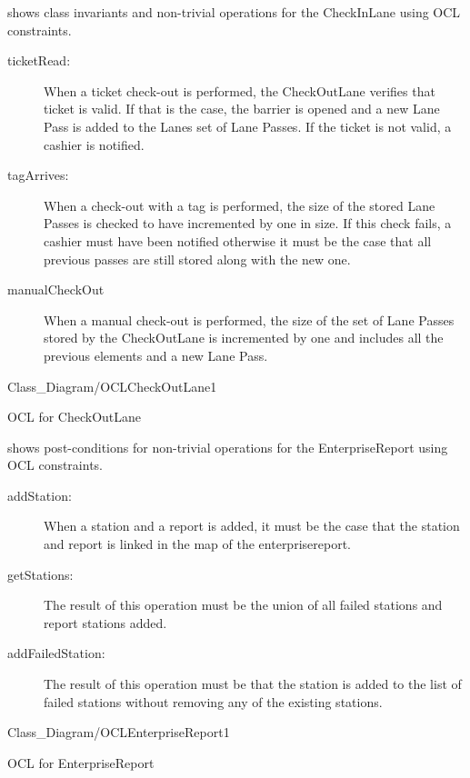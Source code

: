  shows class invariants and non-trivial operations for the CheckInLane using OCL constraints.

\begin{description}
\item [ticketRead:]When a ticket check-out is performed, the CheckOutLane verifies that ticket is valid. If that is the case, the barrier is opened and a new Lane Pass is added to the Lanes set of Lane Passes. If the ticket is not valid, a cashier is notified.
\item [tagArrives:]When a check-out with a tag is performed, the size of the stored Lane Passes is checked to have incremented by one in size. If this check fails, a cashier must have been notified otherwise it must be the case that all previous passes are still stored along with the new one.
\item [manualCheckOut]When a manual check-out is performed, the size of the set of Lane Passes stored by the CheckOutLane is incremented by one and includes all the previous elements and a new Lane Pass.
\end{description}

\begin{myfigure}{Class_Diagram/OCLCheckOutLane}{1}
\caption{OCL for CheckOutLane \madeby{\af}{\mb}}
\label{fig:OCLCheckOutLane}
\end{myfigure}

 shows post-conditions for non-trivial operations for the EnterpriseReport using OCL constraints.

\begin{description}
\item [addStation:] When a station and a report is added, it must be the case that the station and report is linked in the map of the enterprisereport.
\item [getStations:] The result of this operation must be the union of all failed stations and report stations added.
\item [addFailedStation:] The result of this operation must be that the station is added to the list of failed stations without removing any of the existing stations.
\end{description}


\begin{myfigure}{Class_Diagram/OCLEnterpriseReport}{1}
\caption{OCL for EnterpriseReport\madeby{\kj}{\mt}}
\label{fig:OCLEnterpriseReport}
\end{myfigure}

